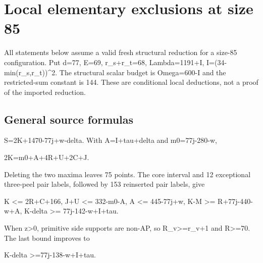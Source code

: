 \documentclass[10pt,a4paper]{article}
\theoremstyle{definition}
\begin{document}
\clearpage
\hypertarget{local-elementary-exclusions-at-size-85}{%
\section{Local elementary exclusions at size
85}\label{local-elementary-exclusions-at-size-85}}

All statements below assume a valid fresh structural reduction for a
size-85 configuration. Put d=\allowbreak{}77,\allowbreak{} \textbar E\textbar=\allowbreak{}69,\allowbreak{} r\_\allowbreak{}s+\allowbreak{}r\_\allowbreak{}t=\allowbreak{}68,\allowbreak{}
Lambda=\allowbreak{}1191+\allowbreak{}I,\allowbreak{} I=\allowbreak{}(34-min(r\_\allowbreak{}s,\allowbreak{}r\_\allowbreak{}t))\^{}2. The structural scalar budget
is Omega=\allowbreak{}600-I and the restricted-sum constant is 144. These are
conditional local deductions,\allowbreak{} not a proof of the imported reduction.

\hypertarget{general-source-formulas}{%
\subsection{General source formulas}\label{general-source-formulas}}

S=\allowbreak{}2K+\allowbreak{}1470-77j+\allowbreak{}w-delta. With A=\allowbreak{}I+\allowbreak{}tau+\allowbreak{}delta and m0=\allowbreak{}77j-280-w,\allowbreak{}

2K=\allowbreak{}m0+\allowbreak{}A+\allowbreak{}4R+\allowbreak{}U+\allowbreak{}2C+\allowbreak{}J.

Deleting the two maxima leaves 75 points. The core interval and 12
exceptional three-peel pair labels,\allowbreak{} followed by 153 reinserted pair
labels,\allowbreak{} give

K \textless=\allowbreak{} 2R+\allowbreak{}C+\allowbreak{}166,\allowbreak{} J+\allowbreak{}U \textless=\allowbreak{} 332-m0-A,\allowbreak{} A \textless=\allowbreak{} 445-77j+\allowbreak{}w,\allowbreak{}
K-M \textgreater=\allowbreak{} R+\allowbreak{}77j-440-w+\allowbreak{}A,\allowbreak{} K-delta \textgreater=\allowbreak{} 77j-142-w+\allowbreak{}I+\allowbreak{}tau.

When z\textgreater0,\allowbreak{} primitive side supports are non-AP,\allowbreak{} so
R\_\allowbreak{}v\textgreater=\allowbreak{}r\_\allowbreak{}v+\allowbreak{}1 and R\textgreater=\allowbreak{}70. The last bound improves to

K-delta \textgreater=\allowbreak{}77j-138-w+\allowbreak{}I+\allowbreak{}tau.
\end{document}
